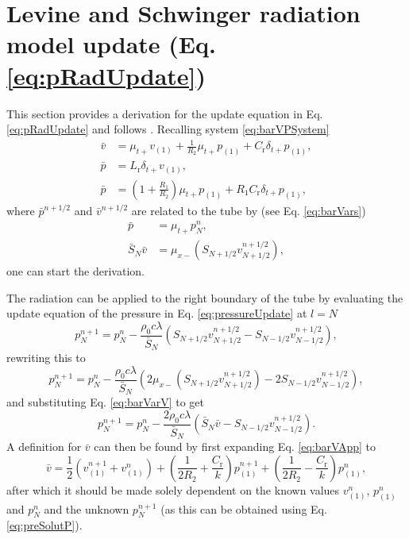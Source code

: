 \section{Levine and Schwinger radiation model update (Eq. \eqref{eq:pRadUpdate})}\label{app:levineSchwingDeriv}
\def\r{\text{r}}
\def\one{{(1)}}
This section provides a derivation for the update equation in Eq. \eqref{eq:pRadUpdate} and follows \cite[Sec. 4.1.3, pp. 109--111]{Harrison2018}. Recalling system \eqref{eq:barVPSystem}
\begin{subequations}\label{eq:barVPSystemApp}
    \begin{align}
        \bar v &= \mu_{t+}v_\one + \frac{1}{R_2}\mu_{t+}p_\one + C_\r \delta_{t+}p_\one,\label{eq:barVApp}\\
        \bar p &= L_\r \delta_{t+}v_\one,\label{eq:barP1App}\\
        \bar p &= \left(1+\frac{R_1}{R_2}\right)\mu_{t+}p_\one+ R_1 C_\r\delta_{t+}p_\one\label{eq:barP2App},
    \end{align}
\end{subequations}
where $\bar p^{n+1/2}$ and $\bar v^{n+1/2}$ are related to the tube by (see Eq. \eqref{eq:barVars})
\begin{align}
    \bar p &= \mu_{t+}p^n_N,\label{eq:barVarP}\\
    \bar S_N \bar v &= \mu_{x-}\left(S_{N+1/2}v_{N+1/2}^{n+1/2}\right),\label{eq:barVarV}
\end{align}
one can start the derivation. 

The radiation can be applied to the right boundary of the tube by evaluating the update equation of the pressure in Eq. \eqref{eq:pressureUpdate} at $l = N$
\begin{equation}
    p_N^{n+1} = p_N^n - \frac{\rho_0 c \lambda}{\bar{S}_N}\left(S_{N+1/2}v_{N+1/2}^{n+1/2}-S_{N-1/2}v_{N-1/2}^{n+1/2}\right),
\end{equation}
rewriting this to 
\begin{equation*}
    p_N^{n+1} = p_N^n - \frac{\rho_0 c \lambda}{\bar{S}_N}\left(2\mu_{x-}\left(S_{N+1/2}v_{N+1/2}^{n+1/2}\right)-2S_{N-1/2}v_{N-1/2}^{n+1/2}\right),
\end{equation*}
and substituting Eq. \eqref{eq:barVarV} to get
\begin{equation}
    p_N^{n+1} = p_N^n - \frac{2\rho_0 c \lambda}{\bar{S}_N}\left(\bar S_N \bar v-S_{N-1/2}v_{N-1/2}^{n+1/2}\right)\label{eq:preSolutP}.
\end{equation}
A definition for $\bar v$ can then be found by first expanding Eq. \eqref{eq:barVApp} to 
\begin{equation}\label{eq:vBarExpanded}
    \bar v = \frac{1}{2}\left(v_\one^{n+1} + v_\one^n\right) + \left(\frac{1}{2R_2} + \frac{C_\r}{k}\right) p_\one^{n+1} +\left(\frac{1}{2R_2} - \frac{C_\r}{k}\right)p_\one^n,
\end{equation}
after which it should be made solely dependent on the known values $v_\one^n$, $p_\one^n$ and $p_N^n$ and the unknown $p_N^{n+1}$ (as this can be obtained using Eq. \eqref{eq:preSolutP}).

